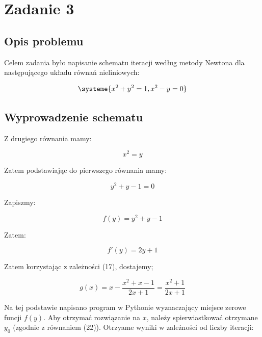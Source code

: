 \documentclass{article}
\begin{document}
	\newpage


	\section*{Zadanie 3}

	\subsection*{Opis problemu}

	Celem zadania było napisanie schematu iteracji według metody Newtona dla następującego układu równań nieliniowych:

	\begin{equation}
		\systeme{x^2+y^2 = 1, x^2 - y = 0}
	\end{equation}

	\subsection*{Wyprowadzenie schematu}

	Z drugiego równania mamy:

	\begin{equation}
		x^2 = y
	\end{equation}

	Zatem podstawiając do pierwszego równania mamy:

	\begin{equation}
		y^2 +y - 1 = 0
	\end{equation}

	Zapiszmy:

	\begin{equation}
		f(y) = y^2 + y - 1
	\end{equation}

	Zatem:

	\begin{equation}
		f'(y) = 2y + 1
	\end{equation}

	Zatem korzystając z zależności (17), dostajemy;

	\begin{equation}
		g(x) = x - \frac{x^2 + x - 1}{2x+1} = \frac{x^2+1}{2x+1}
	\end{equation}

	Na tej podstawie napisano program w Pythonie wyznaczający miejsce zerowe funcji $f(y)$. Aby otrzymać rozwiązanie na $x$, należy spierwiastkować otrzymane $y_0$ (zgodnie z równaniem (22)). Otrzyame wyniki w zależności od liczby iteracji:
\end{document}
